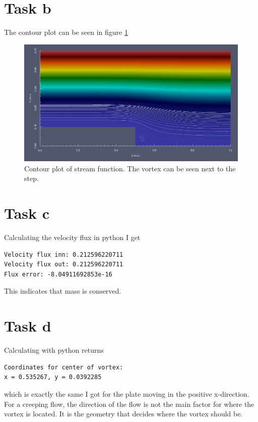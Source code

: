 \documentclass[11pt]{report}
\begin{document}
\section*{Task b}

The contour plot can be seen in figure \ref{fig:ex4b}

\begin{figure}[htb]
\center
\includegraphics[scale=0.2]{images/ex4a_psi.png}
\caption{Contour plot of stream function. The vortex can be seen next to the step.}
\label{fig:ex4b}
\end{figure}






\section*{Task c}

Calculating the velocity flux in python I get
\begin{verbatim}
Velocity flux inn: 0.212596220711
Velocity flux out: 0.212596220711
Flux error: -8.04911692853e-16

\end{verbatim}

This indicates that mass is conserved.

\section*{Task d}

Calculating with python returns
\begin{verbatim}
Coordinates for center of vortex: 
x = 0.535267, y = 0.0392285

\end{verbatim}

which is exactly the same I got for the plate moving in the positive x-direction. For a creeping flow, the direction of the flow is not the main factor for where the vortex is located. It is the geometry that decides where the vortex should be.
\end{document}
